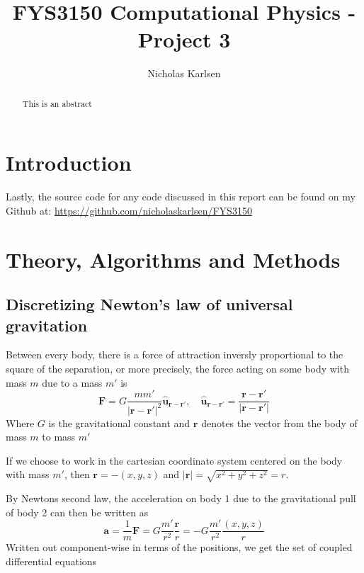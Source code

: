 \documentclass[10pt,showpacs,preprintnumbers,footinbib,amsmath,amssymb,aps,prl,twocolumn,groupedaddress,superscriptaddress,showkeys]{revtex4-1}
\begin{document}
\title{FYS3150 Computational Physics - Project 3}
\author{Nicholas Karlsen}

\begin{abstract}
This is an abstract
\end{abstract}

\maketitle

\section{Introduction}
  
  Lastly, the source code for any code discussed in this report can be found on my
  Github at: \url{https://github.com/nicholaskarlsen/FYS3150}

\section{Theory, Algorithms and Methods}
  
  \subsection{Discretizing Newton's law of universal gravitation}
    Between every body, there is a force of attraction inversly proportional to the square of the separation, or more precisely, the force acting on some body with mass $m$ due to a mass $m'$ is
    \begin{equation}
      \mathbf F = G\frac{m m'}{|\mathbf r - \mathbf r'|^2}\mathbf{\hat{u}_{r-r'}}, \quad \mathbf{\hat{u}_{r-r'}} = \frac{\mathbf r - \mathbf r'}{\mathbf |\mathbf r - \mathbf r'|}
    \end{equation}
    Where $G$ is the gravitational constant and $\mathbf r$ denotes the vector from the body of mass $m$ to mass $m'$

    If we choose to work in the cartesian coordinate system centered on the body with mass $m'$, then $\mathbf r = -(x, y, z)$ and $|\mathbf r| = \sqrt{x^2 + y^2 + z^2} = r$.

    By Newtons second law, the acceleration on body 1 due to the gravitational pull of body 2 can then be written as
    \begin{equation}
      \mathbf a = \frac{1}{m}\mathbf F = G \frac{m'}{r^2}\frac{\mathbf r}{r} = -G\frac{m'}{r^2}\frac{\left(x, y, z\right)}{r}
    \end{equation}
    Written out component-wise in terms of the positions, we get the set of coupled differential equations
\end{document}
